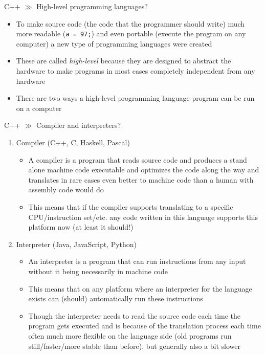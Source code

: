 \documentclass[10pt]{beamer}
\begin{document}
\begin{frame}{C++ $\gg$ High-level programming languages?}
\begin{itemize}
	\item To make source code (the code that the programmer should write) much more readable (\texttt{a = 97;}) and even portable (execute the program on any computer) a new type of programming languages were created
	\item These are called \textit{high-level} because they are designed to abstract the hardware to make programs in most cases completely independent from any hardware
	\item There are two ways a high-level programming language program can be run on a computer
\end{itemize}
\end{frame}

\begin{frame}{C++ $\gg$ Compiler and interpreters?}
\begin{enumerate}
	\item Compiler (C++, C, Haskell, Pascal)
	\begin{itemize}
		\item A compiler is a program that reads source code and produces a stand alone machine code executable and optimizes the code along the way and translates in rare cases even better to machine code than a human with assembly code would do
		\item This means that if the compiler supports translating to a specific CPU/instruction set/etc. any code written in this language supports this platform now (at least it should!)
	\end{itemize}
	\item Interpreter (Java, JavaScript, Python)
	\begin{itemize}
		\item An interpreter is a program that can run instructions from any input without it being necessarily in machine code
		\item This means that on any platform where an interpreter for the language exists can (should) automatically run these instructions
		\item Though the interpreter needs to read the source code each time the program gets executed and is because of the translation process each time often much more flexible on the language side (old programs run still/faster/more stable than before), but generally also a bit slower
	\end{itemize}
\end{enumerate}
\end{frame}
\end{document}
